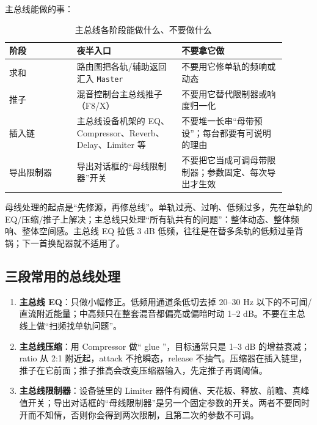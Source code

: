 主总线能做的事：

\begin{table}[htbp]
\centering
\small
\begin{tabular}{@{}p{0.22\linewidth}p{0.34\linewidth}p{0.34\linewidth}@{}}
\hline
阶段 & 夜半入口 & 不要拿它做 \\
\hline
求和 & 路由图把各轨/辅助返回汇入 \texttt{Master} & 不要用它修单轨的频响或动态 \\
推子 & 混音控制台主总线推子（F8/X） & 不要用它替代限制器或响度归一化 \\
插入链 & 主总线设备机架的 EQ、Compressor、Reverb、Delay、Limiter 等 & 不要堆一长串“母带预设”；每台都要有可说明的理由 \\
导出限制器 & 导出对话框的“母线限制器”开关 & 不要把它当成可调母带限制器；参数固定、每次导出才生效 \\
\hline
\end{tabular}
\caption{主总线各阶段能做什么、不要做什么}
\label{tab:master-stages}
\end{table}


母线处理的起点是“先修源，再修总线”。单轨过亮、过响、低频过多，先在单轨的 EQ/压缩/推子上解决；主总线只处理“所有轨共有的问题”：整体动态、整体频响、整体空间感。主总线 EQ 拉低 3 dB 低频，往往是在替多条轨的低频过量背锅；下一首换配器就不适用了。

\subsection{三段常用的总线处理}

\begin{enumerate}
  \item \textbf{主总线 EQ}：只做小幅修正。低频用通道条低切去掉 20–30 Hz 以下的不可闻/直流附近能量；中高频只在整套混音都偏亮或偏暗时动 1–2 dB。不要在主总线上做“扫频找单轨问题”。
  \item \textbf{主总线压缩}：用 Compressor 做“ glue ”，目标通常只是 1–3 dB 的增益衰减；ratio 从 2:1 附近起，attack 不抢瞬态，release 不抽气。压缩器在插入链里，推子在它前面；推子推高会改变压缩器输入，先定推子再调阈值。
  \item \textbf{主总线限制器}：设备链里的 Limiter 器件有阈值、天花板、释放、前瞻、真峰值开关；导出对话框的“母线限制器”是另一个固定参数的开关。两者不要同时开而不知情，否则你会得到两次限制，且第二次的参数不可调。
\end{enumerate}

